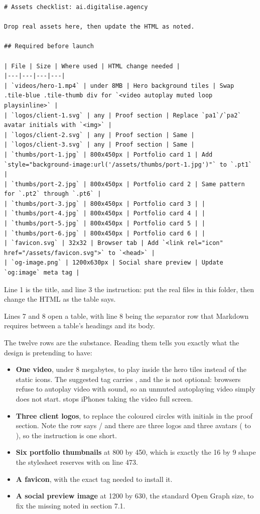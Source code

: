\begin{lstlisting}[firstnumber=1,caption={\file{ASSETS.md}, lines 1--21}]
# Assets checklist: ai.digitalise.agency

Drop real assets here, then update the HTML as noted.

## Required before launch

| File | Size | Where used | HTML change needed |
|---|---|---|---|
| `videos/hero-1.mp4` | under 8MB | Hero background tiles | Swap .tile-blue .tile-thumb div for `<video autoplay muted loop playsinline>` |
| `logos/client-1.svg` | any | Proof section | Replace `pa1`/`pa2` avatar initials with `<img>` |
| `logos/client-2.svg` | any | Proof section | Same |
| `logos/client-3.svg` | any | Proof section | Same |
| `thumbs/port-1.jpg` | 800x450px | Portfolio card 1 | Add `style="background-image:url('/assets/thumbs/port-1.jpg')"` to `.pt1` |
| `thumbs/port-2.jpg` | 800x450px | Portfolio card 2 | Same pattern for `.pt2` through `.pt6` |
| `thumbs/port-3.jpg` | 800x450px | Portfolio card 3 | |
| `thumbs/port-4.jpg` | 800x450px | Portfolio card 4 | |
| `thumbs/port-5.jpg` | 800x450px | Portfolio card 5 | |
| `thumbs/port-6.jpg` | 800x450px | Portfolio card 6 | |
| `favicon.svg` | 32x32 | Browser tab | Add `<link rel="icon" href="/assets/favicon.svg">` to `<head>` |
| `og-image.png` | 1200x630px | Social share preview | Update `og:image` meta tag |
\end{lstlisting}

Line 1 is the title, and line 3 the instruction: put the real files in this folder,
then change the HTML as the table says.

Lines 7 and 8 open a table, with line 8 being the separator row that Markdown
requires between a table's headings and its body.

The twelve rows are the substance. Reading them tells you exactly what the design
is pretending to have:

\begin{itemize}
\item \textbf{One video}, under 8 megabytes, to play inside the hero tiles instead
  of the static icons. The suggested tag carries , and the  is not optional: browsers refuse to autoplay
  video with sound, so an unmuted autoplaying video simply does not start.
   stops iPhones taking the video full screen.
\item \textbf{Three client logos}, to replace the coloured circles with initials in
  the proof section. Note the row says / and there are three
  logos and three avatars ( to ), so the instruction is one
  short.
\item \textbf{Six portfolio thumbnails} at 800 by 450, which is exactly the 16 by 9
  shape the stylesheet reserves with  on line 473.
\item \textbf{A favicon}, with the exact tag needed to install it.
\item \textbf{A social preview image} at 1200 by 630, the standard Open Graph size,
  to fix the missing  noted in section 7.1.
\end{itemize}

